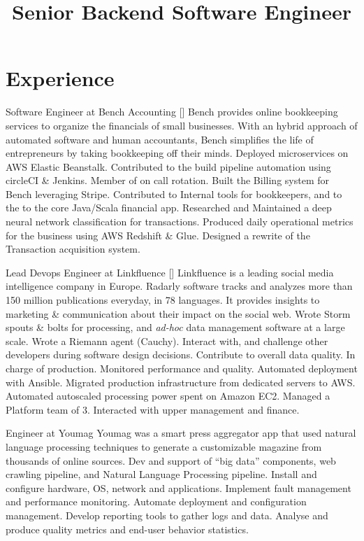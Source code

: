 \documentclass[12pt,a4paper]{moderncv}
\title{Senior Backend Software Engineer}             %
\begin{document}
\maketitle

\section{Experience}

        {\textcolor{subsectioncolor}{Software Engineer at Bench Accounting}}
        {}{}{[]}
{Bench provides online bookkeeping services to organize the financials of small businesses.
  With an hybrid approach of automated software and human accountants, Bench simplifies
  the life of entrepreneurs by taking bookkeeping off their minds.}
{Deployed microservices on AWS Elastic Beanstalk. Contributed to the build pipeline
  automation using circleCI \& Jenkins. Member of on call rotation.}
{Built the Billing system for Bench leveraging Stripe. Contributed to Internal tools for
  bookkeepers, and to the to the core Java/Scala financial app.}
{Researched and Maintained a deep neural network classification for transactions.
  Produced daily operational metrics for the business using AWS Redshift \& Glue.
  Designed a rewrite of the Transaction acquisition system.}

        {\textcolor{subsectioncolor}{Lead Devops Engineer at Linkfluence}}
        {}{}{[]}
{Linkfluence is a leading social media intelligence company in Europe. Radarly
  software tracks and analyzes more than 150 million publications everyday, in 78 languages.
  It provides insights to marketing \& communication about their impact on the social web.}
{Wrote Storm spouts \& bolts for processing, and {\em ad-hoc} data management software
  at a large scale. Wrote a Riemann agent (Cauchy). Interact with, and challenge other
  developers during software design decisions. Contribute to overall data quality.}
{In charge of production. Monitored performance and quality.
  Automated deployment with Ansible. Migrated production infrastructure from dedicated
  servers to AWS. Automated autoscaled processing power spent on Amazon EC2.}
{Managed a Platform team of 3. Interacted with upper management and finance.}

        {\textcolor{subsectioncolor}{Engineer at Youmag}}
        {}{}{}
{Youmag was a smart press aggregator app that used
  natural language processing techniques to generate
  a customizable magazine from thousands of online sources.}
{Dev and support of ``big data'' components, web crawling pipeline,
 and Natural Language Processing pipeline.}
{Install and configure hardware, OS, network and applications.
 Implement fault management and performance monitoring.
 Automate deployment and configuration management.}
{Develop reporting tools to gather logs and data. Analyse and produce
 quality metrics and end-user behavior statistics.}
\end{document}
